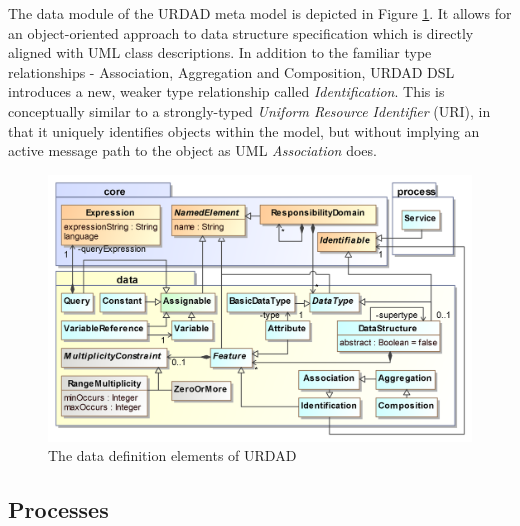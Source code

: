 The data module of the URDAD meta model is depicted in Figure \ref{fig:metamodel-4}. It allows for an object-oriented approach to data structure specification which is directly aligned with UML class descriptions. In addition to the familiar type relationships - Association, Aggregation and Composition, URDAD DSL introduces a new, weaker type relationship called \emph{Identification}. This is conceptually similar to a strongly-typed \emph{Uniform Resource Identifier} (URI), in that it uniquely identifies objects within the model, but without implying an active message path to the object as UML \emph{Association} does.
 
\begin{figure}[Htbp]
  \centering
  \includegraphics{data}
  \caption{The data definition elements of URDAD}
  \label{fig:metamodel-4}
\end{figure}


\subsection{Processes}


